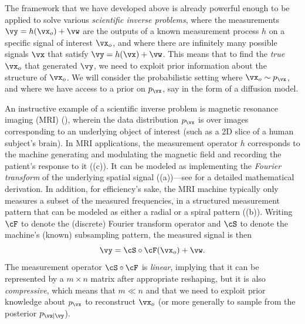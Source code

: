 \documentclass[../../book-main.tex]{subfiles}
\begin{document}

The framework that we have developed above is already powerful enough to be
applied to solve various \textit{scientific inverse problems}, where
the measurements
$\vy = h(\vx_o) + \vw$ are the outputs of a known measurement process $h$ on
a specific signal of interest $\vx_o$, and where there are infinitely many
possible signals $\vx$ that satisfy $\vy = h(\vx) + \vw$. This means that to
find the \textit{true} $\vx_o$ that generated $\vy$, we need to exploit prior
information about the structure of $\vx_o$.
We will consider the probabilistic setting where $\vx_o \sim p_{\vx}$, and where
we have access to a prior on $p_{\vx}$, say in the form of a diffusion model.

An instructive example of a scientific inverse problem is magnetic resonance
imaging (MRI) (), wherein the data distribution
$p_{\vx}$ is over images corresponding to an underlying object of interest (such as
a 2D slice of a human subject's brain). In MRI applications, the measurement
operator $h$ corresponds to the machine generating and modulating the magnetic
field and recording the patient's response to it
((c)). It can be modeled as implementing the
\textit{Fourier transform} of the underlying spatial signal
((a))---see \cite[Chapter 10]{Wright-Ma-2022} for
a detailed mathematical derivation.
In addition, for efficiency's sake, the MRI machine typically only measures
a subset of the measured frequencies, in a structured measurement pattern that
can be modeled as either a radial or a spiral pattern
((b)). Writing $\cF$ to denote the
(discrete) Fourier
transform operator and $\cS$ to denote the machine's (known) subsampling
pattern, the measured signal is then
\begin{equation}\label{eq:mri-measurement}
    \vy = \cS \circ \cF(\vx_o) + \vw.
\end{equation}
The measurement operator $\cS \circ \cF$ is \textit{linear}, implying that it
can be represented by a $m \times n$ matrix after appropriate reshaping, but it
is also \textit{compressive}, which means that $m \ll n$ and that we need to
exploit prior knowledge about $p_{\vx}$ to reconstruct $\vx_o$ (or more
generally to sample from the posterior $p_{\vx \mid \vy}$).
\end{document}
